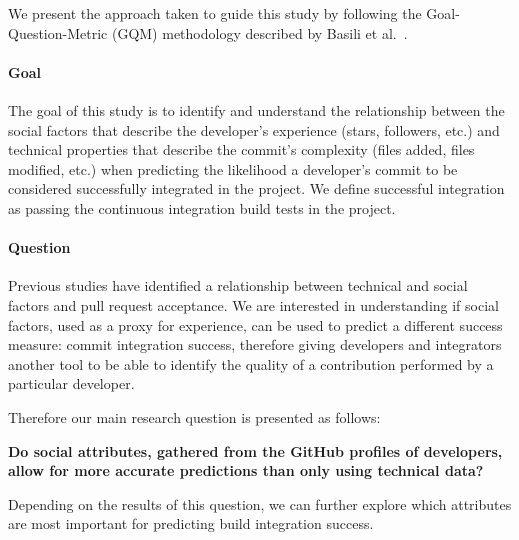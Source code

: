 \documentclass[10pt, conference]{IEEEtran}
\begin{document}
We present the approach taken to guide this study by
following the Goal-Question-Metric (GQM) methodology described by Basili et 
al.~\cite{Basili84}.

\paragraph{Goal}
The goal of this study is to identify and understand the relationship 
between the social factors that describe the
developer's experience (stars, followers, etc.) and technical properties that
describe the commit's complexity
(files added, files modified, etc.)
when predicting the likelihood a developer's commit
to be considered successfully integrated in the project. We define successful
integration as passing the continuous integration build tests in the project.

\paragraph{Question}
Previous studies have identified a relationship between technical and social 
factors and pull request acceptance. We are interested in understanding if
social factors, used as a proxy for experience, can be used to predict
a different success measure: commit integration success, therefore giving
developers and integrators another tool to be able to identify the quality
of a contribution performed by a particular developer.

Therefore our main research question is presented as follows:

\textbf{Do social attributes, gathered 
from the GitHub profiles of developers,
allow for more accurate predictions than only using technical data?}


Depending on the results of this question, we can further explore which
attributes are most important for predicting build integration success.

\begin{comment}
we have created a dataset with technical attributes to be able to analyze the 
predictive power of these attributes and its relationship with commit integration 
success. This way, we are able to create a model
We are afterwards interested in knowing if adding social attributes to this 
predictability model will increase the probability of the model asserting 
correctly future instances by knowing not only technical data about the commit 
being pushed but also social attributes of the developer pushing the changes.
\end{comment}
\end{document}

